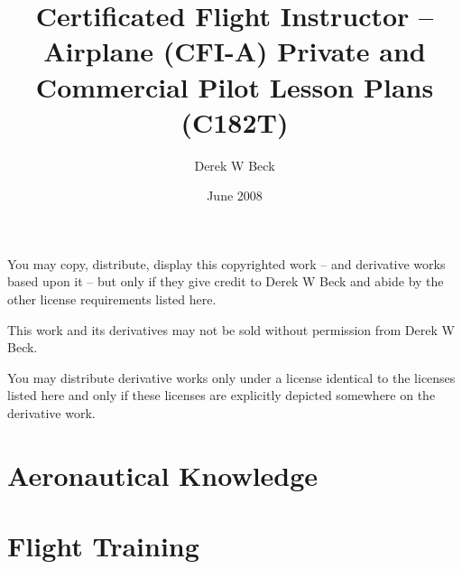 \documentclass[twoside,openright]{report}
\title{Certificated Flight Instructor – Airplane (CFI-A)
Private and Commercial Pilot Lesson Plans (C182T)}
\author{Derek W Beck}
\date{June 2008}
\begin{document}
\makeatletter
\begin{titlepage}
  \begin{center}
    \vspace*{1cm}
    \textbf{\@title}

    \vspace*{1cm}
    \@author

    \@date

    \vspace*{2cm}
    \ccby You may copy, distribute, display this copyrighted work -- and
    derivative works based upon it -- but only if they give credit to Derek W
    Beck and abide by the other license requirements listed here.

    \ccnc This work and its derivatives may not be sold without permission from
    Derek W Beck.

    \ccsa You may distribute derivative works only under a license identical to
    the licenses listed here and only if these licenses are explicitly depicted
    somewhere on the derivative work.
  \end{center}
\end{titlepage}

\setcounter{tocdepth}{1}
\tableofcontents

\chapter{Aeronautical Knowledge}





















\chapter{Flight Training}


































\end{document}
